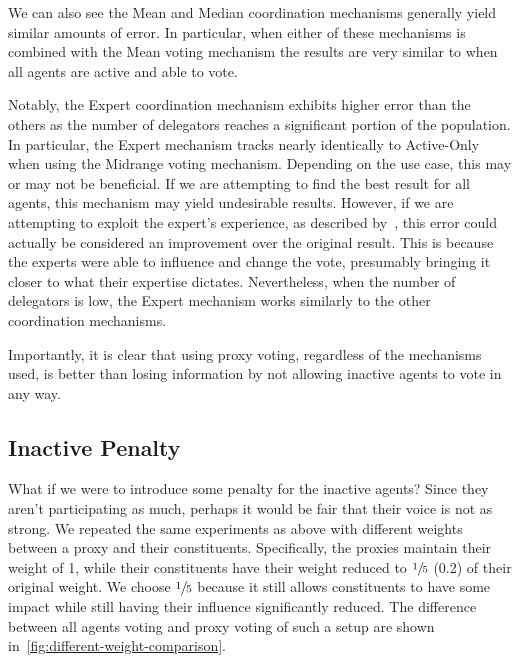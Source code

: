 We can also see the Mean and Median coordination mechanisms generally yield similar
amounts of error.
In particular, when either of these mechanisms is combined with the Mean voting
mechanism the results are very similar to when all agents are active and able to vote.

Notably, the Expert coordination mechanism exhibits higher error than the others as the number
of delegators reaches a significant portion of the population.
In particular, the Expert mechanism tracks nearly identically to Active-Only when
using the Midrange voting mechanism.
Depending on the use case, this may or may not be beneficial.
If we are attempting to find the best result for all agents, this mechanism may yield
undesirable results.
However, if we are attempting to exploit the expert's experience, as described
by~\cite{Miller1969}, this error could actually be considered an improvement over
the original result.
This is because the experts were able to influence and change the vote, presumably
bringing it closer to what their expertise dictates.
Nevertheless, when the number of delegators is low, the Expert mechanism works
similarly to the other coordination mechanisms.

Importantly, it is clear that using proxy voting, regardless of the mechanisms used,
is better than losing information by not allowing inactive agents to vote in any way.

\subsection{Inactive Penalty}\label{subsec:inactive-penalty}
What if we were to introduce some penalty for the inactive agents?
Since they aren't participating as much, perhaps it would be fair that their voice is
not as strong.
We repeated the same experiments as above with different weights between a proxy and
their constituents.
Specifically, the proxies maintain their weight of 1, while their constituents have
their weight reduced to $\sfrac{1}{5}$ (0.2) of their original weight.
We choose $\sfrac{1}{5}$ because it still allows constituents to have some impact
while still having their influence significantly reduced.
The difference between all agents voting and proxy voting of such a setup are
shown in~\autoref{fig:different-weight-comparison}.

